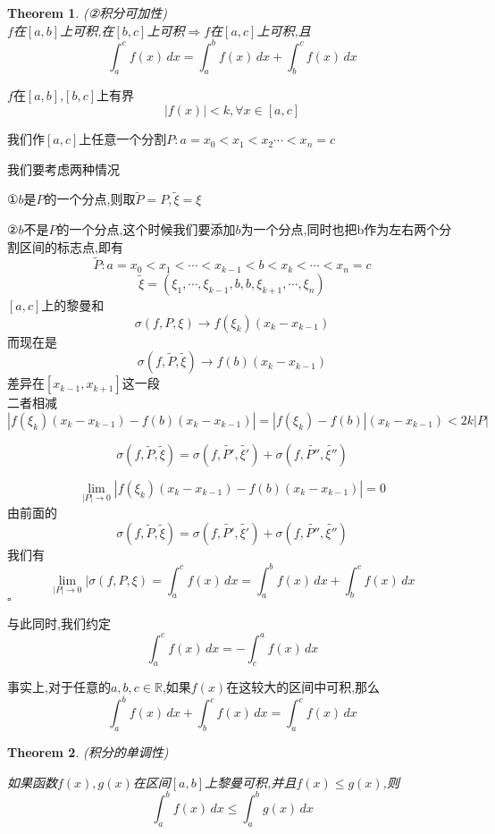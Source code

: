 \documentclass[11pt,hyperref,a4paper,UTF8]{ctexart}
\newtheorem{theorem}{Theorem}[subsection]
\newenvironment{cproof}{%
\heiti{证明}\kaishu
}{%
  \hfill $\square$
  \par\bigskip
}
\newcommand{\RR}{\mathbb{R}}
\begin{document}
\begin{CJK}{UTF8}{gkai}
\begin{theorem}(②积分可加性)\\

  $f$在$[a,b]$上可积,在$[b,c]$上可积$\Rightarrow f$在$[a,c]$上可积,且
  \[\int_{a}^{c}f(x)\,dx=\int_{a}^{b}f(x)\,dx+\int_{b}^{c}f(x)\,dx\]
  
\end{theorem}

\begin{cproof}
$f$在$[a,b]$,$[b,c]$上有界\\
\[|f(x)|<k,\forall x\in[a,c]\]

我们作$[a,c]$上任意一个分割$P: a = x_0< x_1 <x_2\cdots < x_n = c$

我们要考虑两种情况

①$b$是$P$的一个分点,则取$\tilde{P} = P ,\tilde{\xi} = \xi$

②$b$不是$P$的一个分点,这个时候我们要添加$b$为一个分点,同时也把b作为左右两个分割区间的标志点,即有\\

\[\tilde{P}: a = x_0< x_1 <\cdots<x_{k-1} < b< x_k<\cdots < x_n = c\]
\[\tilde{\xi} = (\xi_1,\cdots,\xi_{k-1},b,b,\xi_{k+1},\cdots,\xi_n)\]
$[a,c]$上的黎曼和
\[\sigma(f,P,\xi) \rightarrow f(\xi_k)(x_k - x_{k-1})\]
而现在是
\[\sigma(f,\tilde{P},\tilde{\xi})\rightarrow f(b)(x_k - x_{k-1})\]
差异在$[x_{k-1},x_{k+1}]$这一段\\

二者相减
\[\left|f(\xi_k)(x_k - x_{k-1})-f(b)(x_k - x_{k-1})\right| = \left|f(\xi_k)-f(b)\right|(x_k - x_{k-1}) < 2k |P|\]

\[\sigma(f,\tilde{P},\tilde{\xi}) = \sigma(f,\tilde{P'},\tilde{\xi'}) + \sigma(f,\tilde{P''},\tilde{\xi''})\]

\[\lim_{|P|\to 0}\left|f(\xi_k)(x_k - x_{k-1})-f(b)(x_k - x_{k-1})\right| = 0\]
由前面的
\[\sigma(f,\tilde{P},\tilde{\xi}) = \sigma(f,\tilde{P'},\tilde{\xi'}) + \sigma(f,\tilde{P''},\tilde{\xi''})\]
我们有
\[\lim_{|P|\to 0}|\sigma(f,P,\xi) =\int_{a}^{c}f(x)\,dx=\int_{a}^{b}f(x)\,dx+\int_{b}^{c}f(x)\,dx\]
\end{cproof}
与此同时,我们约定
\[\int_{a}^{c}f(x)\,dx=-\int_{c}^{a}f(x)\,dx\]

事实上,对于任意的$a,b,c\in \RR$,如果$f(x)$在这较大的区间中可积,那么
\[\int_{a}^{b}f(x)\,dx + \int_{b}^{c}f(x)\,dx=\int_{a}^{c}f(x)\,dx\]

\begin{theorem}
  (积分的单调性)

  如果函数$f(x),g(x)$在区间$[a,b]$上黎曼可积,并且$f(x) \leq g(x)$,则
  \[\int_{a}^{b}f(x)\,dx\leq \int_{a}^{b}g(x)\,dx\]
\end{theorem}


\end{CJK}
\end{document}
